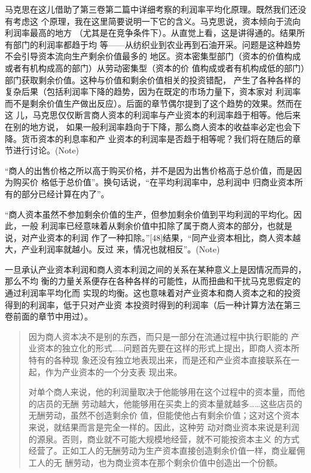 马克思在这儿借助了第三卷第二篇中详细考察的利润率平均化原理。既然我们还没有考虑这
个原理，我在这里简要说明一下它的含义。马克思说，资本倾向于流向利润率最高的地方
（尤其是在竞争条件下）。从直觉上看，这是讲得通的。结果所有部门的利润率都趋于均
等——从纺织业到农业再到石油开采。问题是这种趋势不会引导资本流向生产剩余价值最多的
地区。资本密集型部门（资本的价值构成或者有机构成高的部门）从劳动密集型（资本的价
值构成或者有机构成低的部门）部门获取剩余价值。这种与价值和剩余价值相关的投资错配，
产生了各种各样的复杂后果（包括利润率下降的趋势，因为在既定的市场力量下，资本家对
利润率而不是剩余价值生产做出反应）。后面的章节偶尔提到了这个趋势的效果。然而在这
儿，马克思仅仅断言商人资本的利润率与产业资本的利润率趋于相等。他后来在别的地方说，
如果一般利润率趋向于下降，那么商人资本的收益率必定也会下降。货币资本的利息率和产
业资本的利润率是否趋于相等呢？我们将在随后的章节进行讨论。(Note)

“商人的出售价格之所以高于购买价格，并不是因为出售价格高于总价值，而是因为购买价
格低于总价值”。换句话说，“在平均利润率中，总利润中
归商业资本所有的部分已经计算在内了”。

“商人资本虽然不参加剩余价值的生产，但参加剩余价值到平均利润的平均化。因此，一般
利润率已经意味着从剩余价值中扣除了属于商人资本的部分，也就是说，对产业资本的利润
作了一种扣除。”[48]结果，“同产业资本相比，商人资本越大，产业利润率就越小。反过
来，情况也就相反”。(Note)

一旦承认产业资本利润和商人资本利润之间的关系在某种意义上是因情况而异的，那么不均
衡的力量关系便存在各种各样的可能性，从而扭曲和干扰马克思假定的通过利润率平均化而
实现的均衡。这也意味着对产业资本和商人资本之和的投资得到的利润率，低于只对产业资
本投资时得到的利润率（后一种计算方法在第三卷前面的章节中用过）。

\begin{quotation}因为商人资本决不是别的东西，而只是一部分在流通过程中执行职能的
产业资本的独立化的形式……问题首先要在这样的形式上提出，即商人资本所特有的各种现
象还没有独立地表现出来，而是还和产业资本直接联系在一起，作为产业资本的一个分支表
现出来。

  对单个商人来说，他的利润量取决于他能够用在这个过程中的资本量，而他的店员的无酬
劳动越大，他能够用在买卖上的资本量就越多……这些店员的无酬劳动，虽然不创造剩余价
值，但能使他占有剩余价值；这对这个资本来说，就结果而言是完全一样的。因此，这种劳
动对商业资本来说是利润的源泉。否则，商业就不可能大规模地经营，就不可能按资本主义
的方式经营了。正如工人的无酬劳动为生产资本直接创造剩余价值一样，商业雇佣工人的无
酬劳动，也为商业资本在那个剩余价值中创造出一个份额。
\end{quotation}


